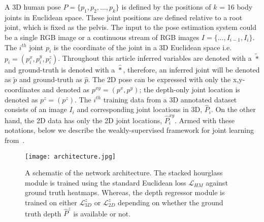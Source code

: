 \documentclass[runningheads]{llncs}
\begin{document}
A 3D human pose \(P = \{p_1, p_2, \ldots, p_k \}\) is defined by the positions of $k$ = 16 body joints in Euclidean space. These joint positions are defined relative to a root joint, which is fixed as the pelvis. The input to the pose estimation system could be a single RGB image or a continuous stream of RGB images \(I = \{ \ldots, I_{i-1}, I_i\}\). The $i^{th}$ joint $p_i$ is the coordinate of the joint in a 3D Euclidean space i.e. $p_i = (p_i^x, p_i^y, p_i^z )$. Throughout this article inferred variables are denoted with a $\tilde{*}$ and ground-truth is denoted with a $\hat{*}$, therefore, an inferred joint will be denoted as $\tilde{p}$ and ground-truth as $\hat{p}$. The 2D pose can be expressed with only the x,y-coordinates and denoted as $p^{xy} = (p^x, p^y)$; the depth-only joint location is denoted as $p^z = (p^z)$. The $i^{th}$ training data from a 3D annotated dataset consists of an image $I_i$ and corresponding joint locations in 3D, $\hat{P}_i$. On the other hand, the 2D data has only the 2D joint locations, $\hat{P}_i^{xy}$. Armed with these notations, below we describe the weakly-supervised framework for joint learning from~\cite{Zhou_2017_ICCV}.

\begin{figure}[!h] 
	\centering
	\texttt{[image: architecture.jpg]}
    \caption{ A schematic of the network architecture. The stacked hourglass module is trained using the standard Euclidean loss $\mathcal{L}_{HM}$ against ground truth heatmaps. Whereas, the depth regressor module is trained on either $\mathcal{L}^z_{3D}$ or $\mathcal{L}^z_{2D}$ depending on whether the ground truth depth $\hat{P}^z$ is available or not.} 
	\vspace{-1em}
	\label{fig:architecture}
\end{figure}
\end{document}
